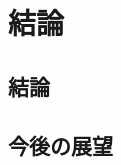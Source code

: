 \documentclass[../main]{subfiles}
\begin{document}
\chapter{結論}
\label{cp:conclusion}
\thispagestyle{empty}
\minitoc
\newpage

\section{結論}
\label{sec:conc_conclusion}

\clearpage

\section{今後の展望}
\label{sec:conc_future}

\clearpage
\end{document}
